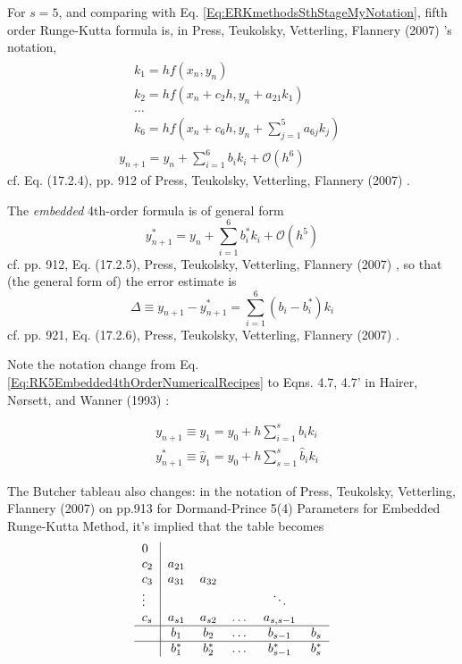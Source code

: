 \documentclass[10pt]{amsart}
\begin{document}
\begin{multicols*}{2}
For $s=5$, and comparing with Eq. \ref{Eq:ERKmethodsSthStageMyNotation}, fifth order Runge-Kutta formula is, in Press, Teukolsky, Vetterling, Flannery (2007) \cite{PTVF2007}'s notation,
\begin{equation}\label{Eq:FifthOrderRungeKuttaNumericalRecipes}
	\begin{gathered}
		\begin{aligned}
			& k_1 = h f(x_n, y_n) \\
			& k_2 = hf(x_n + c_2 h, y_n + a_{21} k_1) \\
			& \dots \\
			& k_6 = hf(x_n + c_6 h, y_n + \sum_{j=1}^5 a_{6j} k_j)
		\end{aligned} \\
	y_{n+1} = y_n + \sum_{i=1}^6 b_i k_i + \mathcal{O}(h^6)
	\end{gathered}
\end{equation} cf. Eq. (17.2.4),  pp. 912 of Press, Teukolsky, Vetterling, Flannery (2007) \cite{PTVF2007}.

The \emph{embedded} 4th-order formula is of general form
\begin{equation}\label{Eq:RK5Embedded4thOrderNumericalRecipes}
y^*_{n+1} = y_n + \sum_{i=1}^6 b_i^* k_i + \mathcal{O}(h^5)
\end{equation}
cf. pp. 912, Eq. (17.2.5), Press, Teukolsky, Vetterling, Flannery (2007) \cite{PTVF2007}, so that (the general form of) the error estimate is
\begin{equation}
	\Delta \equiv y_{n+1} - y^*_{n+1} = \sum_{i=1}^6 (b_i -b_i^*) k_i
\end{equation}
cf. pp. 921, Eq. (17.2.6), Press, Teukolsky, Vetterling, Flannery (2007) \cite{PTVF2007}.

Note the notation change from Eq. \ref{Eq:RK5Embedded4thOrderNumericalRecipes} to Eqns. 4.7, 4.7' in  Hairer, N\o rsett, and Wanner (1993) \cite{HNW1993}:

\[
\begin{aligned}
& y_{n+1} \equiv y_1  = y_0 + h \sum_{i=1}^s b_i k_i \\
& y_{n+1}^* \equiv \widehat{y}_1 = y_0 + h \sum_{s=1}^s \widehat{b}_i k_i
\end{aligned}
\]

The Butcher tableau also changes: in the notation of  Press, Teukolsky, Vetterling, Flannery (2007) \cite{PTVF2007} on pp.913 for Dormand-Prince 5(4) Parameters for Embedded Runge-Kutta Method, it's implied that the table becomes
\[
	\begin{tabular}{ l|c c c c c }
		0 & & & & & \\
		$c_2$ & $a_{21}$ &  & & & \\ 
		$c_3$ & $a_{31}$ & $a_{32}$ & & & \\ 
		$\vdots$ &  & & & $\ddots$ & \\ 
		$c_s$ & $a_{s1}$ & $a_{s2}$ & \dots & $a_{s, s-1}$ & \\
		\hline 
		& $b_1$ & $b_2$ & \dots & $b_{s-1}$ & $b_s$ \\	
		\hline 
		& $b^*_1$ & $b^*_2$ & \dots & $b^*_{s-1}$ & $b^*_s$ \\	
	\end{tabular}
\]


\end{multicols*}
\end{document}
